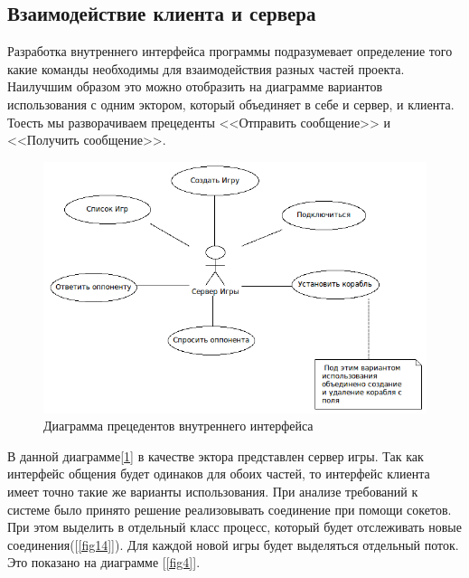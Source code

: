﻿\subsection{Взаимодействие клиента и сервера}
  Разработка внутреннего интерфейса программы подразумевает определение того какие команды необходимы для взаимодействия разных частей проекта. Наилучшим образом это можно отобразить на диаграмме вариантов использования с одним эктором, который объединяет в себе и сервер, и клиента. Тоесть мы разворачиваем прецеденты <<Отправить сообщение>> и <<Получить сообщение>>.  

\begin{figure}[ht]
\centering
\includegraphics[width=15cm]{images/interface.png}
\caption{Диаграмма прецедентов внутреннего интерфейса}
\label{fig3}
\end{figure}

В данной диаграмме[\ref{fig3}] в качестве эктора представлен сервер игры. Так как интерфейс общения будет одинаков для обоих частей, то интерфейс клиента имеет точно такие же варианты использования. При анализе требований к системе было принято решение реализовывать соединение при помощи сокетов. При этом выделить в отдельный класс процесс, который будет отслеживать новые соединения([\ref{fig14}]). Для каждой новой игры будет выделяться отдельный поток. Это показано на диаграмме [\ref{fig4}].

